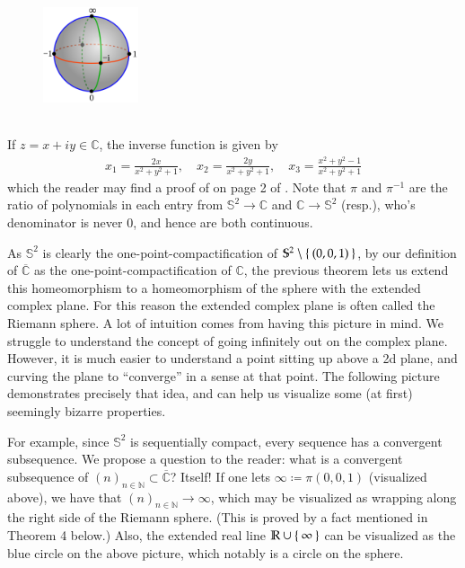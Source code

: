 \documentclass[12pt]{article}
\theoremstyle{definitionstyle}
\def\mbb#1{\mathbb{#1}}
\def\bN{\mbb{N}}
\def \C{\mbb{C}}
\def \R{\mbb{R}}
\renewcommand{\S}{\mbb S}
\begin{document}
	
	\begin{figure} %
		\includegraphics[width=0.25\textwidth, height=3.8cm]{riemannsphere}
	\end{figure}
	If $z = x+iy \in \C$, the inverse function is given by \begin{align*}
		x_1 = \frac{2x}{x^2+y^2+1}, \quad x_2 = \frac{2y}{x^2+y^2+1}, \quad x_3 = \frac{x^2+y^2-1}{x^2+y^2+1}
	\end{align*}
	which the reader may find a proof of on page 2 of \cite{complex}. Note that $\pi$ and $\pi^{-1}$ are the ratio of polynomials in each entry from $\S^2 \to \C$ and $\C \to \S^2$ (resp.), who's denominator is never 0, and hence are both continuous.
	
	As $\S^2$ is clearly the one-point-compactification of $\S^2 \setminus \Set{(0, 0, 1)}$, by our definition of $\overline{\C}$ as the one-point-compactification of $\C$, the previous theorem lets us extend this homeomorphism to a homeomorphism of the sphere with the extended complex plane. For this reason the extended complex plane is often called the Riemann sphere. A lot of intuition comes from having this picture in mind. We struggle to understand the concept of going infinitely out on the complex plane. However, it is much easier to understand a point sitting up above a 2d plane, and curving the plane to ``converge'' in a sense at that point. The following picture demonstrates precisely that idea, and can help us visualize some (at first) seemingly bizarre properties.
	
	For example, since $\S^2$ is sequentially compact, every sequence has a convergent subsequence. We propose a question to the reader: what is a convergent subsequence of $(n)_{n \in \bN} \subset \overline{\C}$? Itself! If one lets $\infty \coloneqq \pi(0, 0, 1)$ (visualized above), we have that $(n)_{n \in \bN} \to \infty$, which may be visualized as wrapping along the right side of the Riemann sphere. (This is proved by a fact mentioned in Theorem 4 below.) Also, the extended real line $\R \cup \Set{\infty}$ can be visualized as the blue circle on the above picture, which notably is a circle on the sphere.
	
\end{document}
